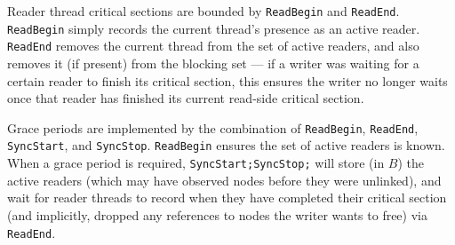 Reader thread critical sections are
bounded by \lstinline|ReadBegin| and \lstinline|ReadEnd|.  \lstinline|ReadBegin| simply records the current thread's presence as an active reader.
\lstinline|ReadEnd| removes the current thread from the set of active readers, and also removes it (if present) from the blocking set --- if a writer was waiting for a certain reader to finish its critical section, this ensures the writer no longer waits once that reader has finished its current read-side critical section.

Grace periods are implemented by the combination of \lstinline|ReadBegin|, \lstinline|ReadEnd|, \lstinline|SyncStart|, and \lstinline|SyncStop|.
\lstinline|ReadBegin| ensures the set of active readers is known.  When a grace period is required, \lstinline|SyncStart;SyncStop;| will store (in $B$) the active readers (which may have observed nodes before they were unlinked), and wait for reader threads to record when they have completed their critical section (and implicitly, dropped any references to nodes the writer wants to free) via \lstinline|ReadEnd|.

